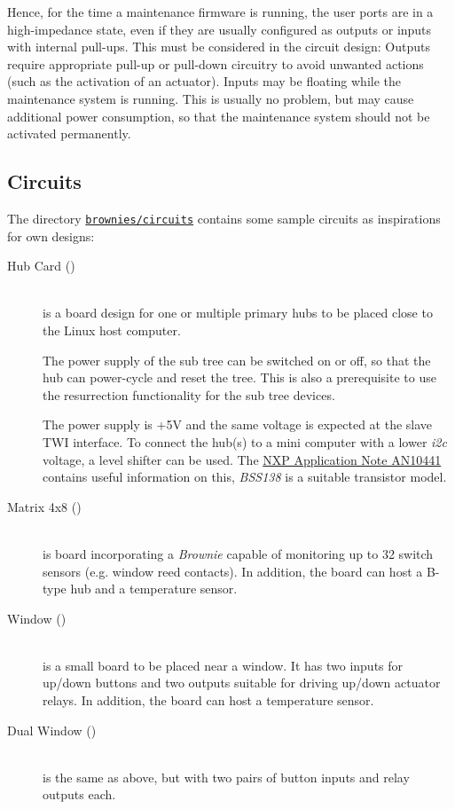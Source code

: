 \documentclass[12pt,english,parskip=half,headheight=19pt]{scrreprt}
\newcommand{\refsrc}[1]{\href{#1}{\texttt{#1}}}     %
\begin{document}
Hence, for the time a maintenance firmware is running, the user ports are in a high-impedance state, even if they are usually configured as outputs or inputs with internal pull-ups. This must be considered in the circuit design: Outputs require appropriate pull-up or pull-down circuitry to avoid unwanted actions (such as the activation of an actuator). Inputs may be floating while the maintenance system is running. This is usually no problem, but may cause additional power consumption, so that the maintenance system should not be activated permanently.



\subsection{Circuits}

The directory \refsrc{brownies/circuits} contains some sample circuits as inspirations for own designs:
\begin{description}
  \item[Hub Card ()] ~ \\
    is a board design for one or multiple primary hubs to be placed close to the Linux host computer.

    The power supply of the sub tree can be switched on or off, so that the hub can power-cycle and
    reset the tree. This is also a prerequisite to use the resurrection functionality for the sub tree
    devices.

    The power supply is +5V and the same voltage is expected at the slave TWI interface. To connect
    the hub(s) to a mini computer with a lower \textit{i2c} voltage, a level shifter can be used.
    The \href{https://www.nxp.com/docs/en/application-note/AN10441.pdf}{NXP Application Note AN10441}
    contains useful information on this, \textit{BSS138} is a suitable transistor model.

  \item[Matrix 4x8 ()] ~ \\
    is board incorporating a \textit{Brownie} capable of monitoring up to 32 switch sensors
    (e.g. window reed contacts). In addition, the board can host a B-type hub and a temperature
    sensor.

  \item[Window ()] ~ \\
    is a small board to be placed near a window. It has two inputs for up/down buttons and two
    outputs suitable for driving up/down actuator relays. In addition, the board can host a
    temperature sensor.

  \item[Dual Window ()] ~ \\
    is the same as above, but with two pairs of button inputs and relay outputs each.

\end{description}
\end{document}
